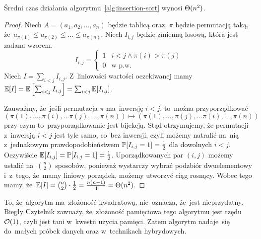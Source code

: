 \begin{fact}
    Średni czas działania algorytmu~\ref{alg:insertion-sort}
    wynosi \( \Theta (n^2) \).
\end{fact}
\begin{proof}
    Niech \( A = (a_1, a_2, \dotsc, a_n) \) będzie
    tablicą oraz, \( \pi \) będzie permutacją
    taką, że~\( a_{\pi(1)} \le a_{\pi(2)} 
    \le \dotsc \le a_{\pi(n)} \).
    Niech \( I_{i,j} \) będzie zmienną losową, która 
    jest zadana wzorem.
    \begin{equation*}
        I_{i,j} = \begin{cases}
            1 & i < j \wedge \pi(i) > \pi(j) \\
            0 & \text{w p.w.}
        \end{cases}
    \end{equation*}
    Niech \( I = \sum_{i < j} I_{i, j} \).
    Z~liniowości wartości oczekiwanej mamy 
    \( \operatorname{\mathbb{E}} [I] = \operatorname{\mathbb{E}} \left[ \sum_{i < j} I_{i, j} \right] 
    = \sum_{i < j} \operatorname{\mathbb{E}} [I_{i, j}] \).

    Zauważmy, że~jeśli permutacja \( \pi \)
    ma~inwersję \( i < j \), to~można przyporządkować 
    \begin{equation*}
        (\pi(1), \dotsc, \pi(i), \dotsc \pi(j), \dotsc, 
        \pi(n)) \mapsto 
        (\pi(1), \dotsc, \pi(j), \dotsc \pi(i), \dotsc, 
        \pi(n))
    \end{equation*}
    przy czym
    to~przyporządkowanie jest bijekcją.
    Stąd otrzymujemy, że permutacji z~inwersją \( i < j \)
    jest tyle samo, co~bez inwersji, czyli możemy
    natrafić na~nią z~jednakowym prawdopodobieństwem
    \( \operatorname{\mathbb{P}} [I_{i, j} = 1] = \frac{1}{2} \) dla dowolnych
    \( i < j \). Oczywiście \( \operatorname{\mathbb{E}} [I_{i, j}] 
    = \operatorname{\mathbb{P}} [I_{i, j} = 1] = \frac{1}{2} \).
    Uporządkowanych par \( (i, j) \) możemy 
    ustalić na~\( \binom{n}{2} \) sposobów,
    ponieważ wystarczy wybrać podzbiór dwuelementowy
    i~z~tego, że~mamy liniowy porządek, możemy
    utworzyć ciąg rosnący.
    Wobec tego mamy, 
    że~\( \operatorname{\mathbb{E}} [I] = \binom{n}{2} \cdot \frac{1}{2} 
    = \frac{n(n - 1)}{4} = \Theta (n^2) \).
\end{proof}

To, że~algorytm ma~złożoność kwadratową, nie~oznacza,
że~jest nieprzydatny. Biegły Czytelnik zawuaży, 
że~złożoność pamięciowa tego algorytmu jest 
rzędu \( \mathcal{O} (1) \), czyli jest tani w~kwestii
użycia pamięci. Zatem algorytm nadaje~się
do~małych próbek danych oraz w~technikach
hybrydowych.

